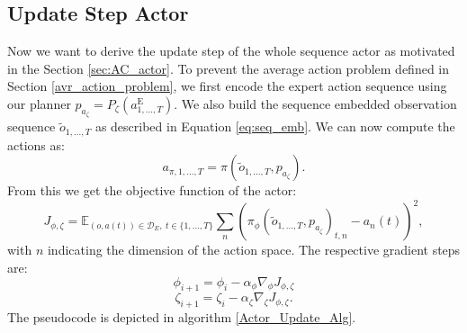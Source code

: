 \subsection{Update Step Actor}
Now we want to derive the update step of the whole sequence actor as motivated in the Section \ref{sec:AC_actor}.
To prevent the average action problem defined in Section \ref{avr_action_problem}, we first encode the expert action sequence using our planner $p_{a_{\zeta}} = P_{\zeta}(a^{\text{E}}_{1, ..., T})$. 
We also build the sequence embedded observation sequence $\tilde{o}_{1, ..., T}$ as described in Equation \ref{eq:seq_emb}. We can now compute the actions as:
\begin{equation*}
    a_{\pi, 1,...,T} = \pi(\tilde{o}_{1, ..., T},p_{a_{\zeta}}).
\end{equation*}
From this we get the objective function of the actor:
\begin{equation}
    \label{actor_objective}
    J_{\phi, \zeta} = \mathbb{E}_{(o, a(t)) \in \mathcal{D}_E,\ t \in \{1, ..., T\}}\sum_n \left( \pi_{\phi}(\tilde{o}_{1, ..., T}, p_{a_{\zeta}})_{t, n} - a_{n}(t)\right)^2,
\end{equation}
with $n$ indicating the dimension of the action space. The respective gradient steps are:
\begin{equation*}
    \phi_{i+1} = \phi_i - \alpha_{\phi} \nabla_{\phi}J_{\phi, \zeta}
\end{equation*}
\begin{equation*}
    \zeta_{i+1} = \zeta_i - \alpha_{\zeta} \nabla_{\zeta}J_{\phi, \zeta}.
\end{equation*}
The pseudocode is depicted in algorithm \ref{Actor_Update_Alg}.
